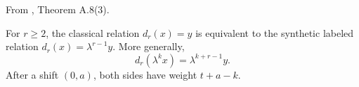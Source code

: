 \begin{theorem}
\label{sem:Literature:differential-rigidity}
From \cite{BHS}, Theorem A.8(3).\par

For $r\ge2$, the classical relation $d_r(x)=y$ is equivalent to the synthetic labeled relation $d_r(x)=\lambda^{r-1}y$. More generally,
\[d_r(\lambda^k x)=\lambda^{k+r-1}y.\]
After a shift $(0,a)$, both sides have weight $t+a-k$.
\end{theorem}


